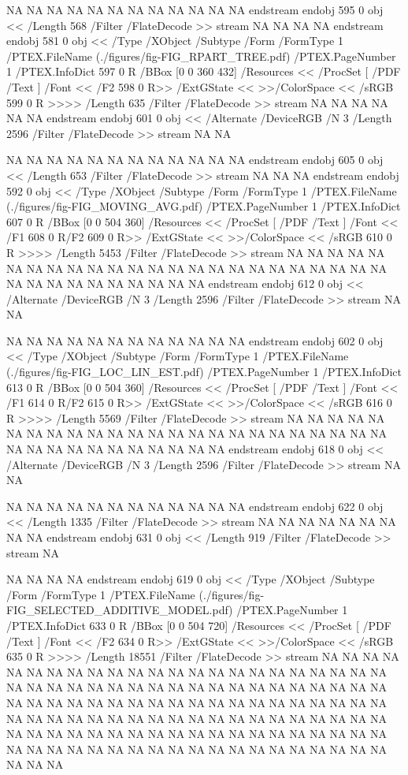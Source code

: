 {NA
NA
NA
NA
NA
NA
NA
NA
NA
NA
NA
NA
endstream
endobj
595 0 obj <<
/Length 568       
/Filter /FlateDecode
>>
stream
NA
NA
NA
NA
endstream
endobj
581 0 obj <<
/Type /XObject
/Subtype /Form
/FormType 1
/PTEX.FileName (./figures/fig-FIG_RPART_TREE.pdf)
/PTEX.PageNumber 1
/PTEX.InfoDict 597 0 R
/BBox [0 0 360 432]
/Resources <<
/ProcSet [ /PDF /Text ]
/Font << /F2 598 0 R>>
/ExtGState <<
>>/ColorSpace <<
/sRGB 599 0 R
>>>>
/Length 635
/Filter /FlateDecode
>>
stream
NA
NA
NA
NA
NA
NA
endstream
endobj
601 0 obj
<<
/Alternate /DeviceRGB
/N 3
/Length 2596
/Filter /FlateDecode
>>
stream
NA
NA

NA
NA
NA
NA
NA
NA
NA
NA
NA
NA
NA
NA
endstream
endobj
605 0 obj <<
/Length 653       
/Filter /FlateDecode
>>
stream
NA
NA
NA
endstream
endobj
592 0 obj <<
/Type /XObject
/Subtype /Form
/FormType 1
/PTEX.FileName (./figures/fig-FIG_MOVING_AVG.pdf)
/PTEX.PageNumber 1
/PTEX.InfoDict 607 0 R
/BBox [0 0 504 360]
/Resources <<
/ProcSet [ /PDF /Text ]
/Font << /F1 608 0 R/F2 609 0 R>>
/ExtGState <<
>>/ColorSpace <<
/sRGB 610 0 R
>>>>
/Length 5453
/Filter /FlateDecode
>>
stream
NA
NA
NA
NA
NA
NA
NA
NA
NA
NA
NA
NA
NA
NA
NA
NA
NA
NA
NA
NA
NA
NA
NA
NA
NA
NA
NA
NA
NA
NA
NA
NA
NA
NA
endstream
endobj
612 0 obj
<<
/Alternate /DeviceRGB
/N 3
/Length 2596
/Filter /FlateDecode
>>
stream
NA
NA

NA
NA
NA
NA
NA
NA
NA
NA
NA
NA
NA
NA
endstream
endobj
602 0 obj <<
/Type /XObject
/Subtype /Form
/FormType 1
/PTEX.FileName (./figures/fig-FIG_LOC_LIN_EST.pdf)
/PTEX.PageNumber 1
/PTEX.InfoDict 613 0 R
/BBox [0 0 504 360]
/Resources <<
/ProcSet [ /PDF /Text ]
/Font << /F1 614 0 R/F2 615 0 R>>
/ExtGState <<
>>/ColorSpace <<
/sRGB 616 0 R
>>>>
/Length 5569
/Filter /FlateDecode
>>
stream
NA
NA
NA
NA
NA
NA
NA
NA
NA
NA
NA
NA
NA
NA
NA
NA
NA
NA
NA
NA
NA
NA
NA
NA
NA
NA
NA
NA
NA
NA
NA
NA
NA
NA
NA
endstream
endobj
618 0 obj
<<
/Alternate /DeviceRGB
/N 3
/Length 2596
/Filter /FlateDecode
>>
stream
NA
NA

NA
NA
NA
NA
NA
NA
NA
NA
NA
NA
NA
NA
endstream
endobj
622 0 obj <<
/Length 1335      
/Filter /FlateDecode
>>
stream
NA
NA
NA
NA
NA
NA
NA
NA
NA
endstream
endobj
631 0 obj <<
/Length 919       
/Filter /FlateDecode
>>
stream
NA

NA
NA
NA
NA
endstream
endobj
619 0 obj <<
/Type /XObject
/Subtype /Form
/FormType 1
/PTEX.FileName (./figures/fig-FIG_SELECTED_ADDITIVE_MODEL.pdf)
/PTEX.PageNumber 1
/PTEX.InfoDict 633 0 R
/BBox [0 0 504 720]
/Resources <<
/ProcSet [ /PDF /Text ]
/Font << /F2 634 0 R>>
/ExtGState <<
>>/ColorSpace <<
/sRGB 635 0 R
>>>>
/Length 18551
/Filter /FlateDecode
>>
stream
NA
NA
NA
NA
NA
NA
NA
NA
NA
NA
NA
NA
NA
NA
NA
NA
NA
NA
NA
NA
NA
NA
NA
NA
NA
NA
NA
NA
NA
NA
NA
NA
NA
NA
NA
NA
NA
NA
NA
NA
NA
NA
NA
NA
NA
NA
NA
NA
NA
NA
NA
NA
NA
NA
NA
NA
NA
NA
NA
NA
NA
NA
NA
NA
NA
NA
NA
NA
NA
NA
NA
NA
NA
NA
NA
NA
NA
NA
NA
NA
NA
NA
NA
NA
NA
NA
NA
NA
NA
NA
NA
NA
NA
NA
NA
NA
NA
NA
NA
NA
NA
NA
NA
NA
NA
NA
NA
NA
NA
NA
NA
NA
NA
NA
NA
NA
NA
NA
NA
NA
NA



}
